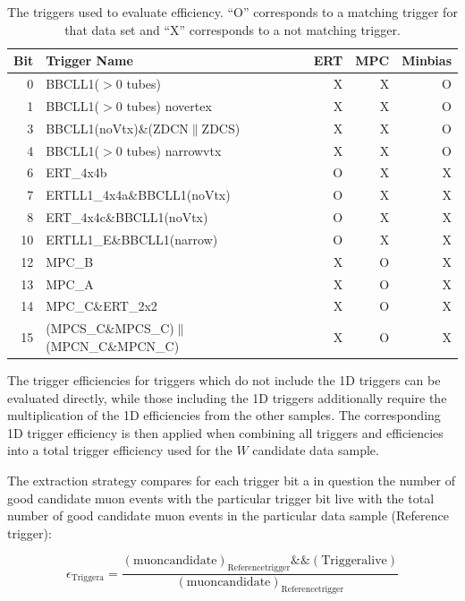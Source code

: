 \begin{table}[ht]
  \centering
  \begin{tabular}{r|l|r|r|r}
    \toprule
    \textbf{Bit} & 
    \textbf{Trigger Name} & 
    \textbf{ERT} & 
    \textbf{MPC} & 
    \textbf{Minbias} \\ 
    \midrule
    0 & BBCLL1($>$0 tubes)  & X & X & O\\
    1 & BBCLL1($>$0 tubes) novertex  & X & X & O\\
    3 & BBCLL1(noVtx)\&(ZDCN$\|$ZDCS) & X & X & O\\
    4 & BBCLL1($>$0 tubes) narrowvtx & X & X & O\\
    6 & ERT\_4x4b & O & X & X\\
    7 & ERTLL1\_4x4a\&BBCLL1(noVtx) & O & X & X\\
    8 & ERT\_4x4c\&BBCLL1(noVtx) & O & X & X\\
    10 & ERTLL1\_E\&BBCLL1(narrow) & O & X & X\\
    12 & MPC\_B & X & O & X\\
    13 & MPC\_A & X & O & X\\
    14 & MPC\_C\&ERT\_2x2 & X & O & X\\
    15 & (MPCS\_C\&MPCS\_C)$\|$(MPCN\_C\&MPCN\_C) & X & O & X\\ 
    \bottomrule
    \end{tabular}
    \caption{
      The triggers used to evaluate efficiency. ``O'' corresponds to a matching
      trigger for that data set and ``X'' corresponds to a not matching trigger.
    }
    \label{tab:trigger_example}
\end{table}

The trigger efficiencies for triggers which do not include the 1D triggers can
be evaluated directly, while those including the 1D triggers additionally
require the multiplication of the 1D efficiencies from the other samples. The
corresponding 1D trigger efficiency is then applied when combining all triggers
and efficiencies into a total trigger efficiency used for the $W$ candidate data
sample. 

The extraction strategy compares for each trigger bit a in question
the number of good candidate muon events with the particular trigger bit live
with the total number of good candidate muon events in the particular data
sample (Reference trigger):

\begin{equation}
\epsilon_{\mathrm{Trigger a}} = \frac{(\mathrm{muon
candidate})_{\mathrm{Reference trigger}} \&\& (\mathrm{Trigger a live})
  }{(\mathrm{muon candidate})_{\mathrm{Reference trigger}}}
\end{equation}

